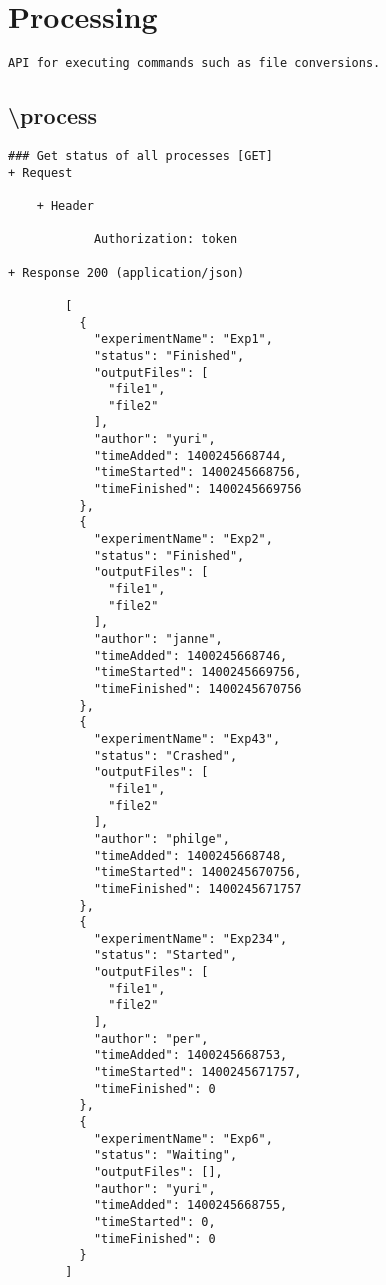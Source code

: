 \section*{Processing}
\begin{verbatim}
API for executing commands such as file conversions.
\end{verbatim}

\subsection*{\textbackslash process}
\begin{verbatim}
### Get status of all processes [GET]
+ Request

    + Header
    
            Authorization: token
            
+ Response 200 (application/json)

        [
          {
            "experimentName": "Exp1",
            "status": "Finished",
            "outputFiles": [
              "file1",
              "file2"
            ],
            "author": "yuri",
            "timeAdded": 1400245668744,
            "timeStarted": 1400245668756,
            "timeFinished": 1400245669756
          },
          {
            "experimentName": "Exp2",
            "status": "Finished",
            "outputFiles": [
              "file1",
              "file2"
            ],
            "author": "janne",
            "timeAdded": 1400245668746,
            "timeStarted": 1400245669756,
            "timeFinished": 1400245670756
          },
          {
            "experimentName": "Exp43",
            "status": "Crashed",
            "outputFiles": [
              "file1",
              "file2"
            ],
            "author": "philge",
            "timeAdded": 1400245668748,
            "timeStarted": 1400245670756,
            "timeFinished": 1400245671757
          },
          {
            "experimentName": "Exp234",
            "status": "Started",
            "outputFiles": [
              "file1",
              "file2"
            ],
            "author": "per",
            "timeAdded": 1400245668753,
            "timeStarted": 1400245671757,
            "timeFinished": 0
          },
          {
            "experimentName": "Exp6",
            "status": "Waiting",
            "outputFiles": [],
            "author": "yuri",
            "timeAdded": 1400245668755,
            "timeStarted": 0,
            "timeFinished": 0
          }
        ]
\end{verbatim}    
